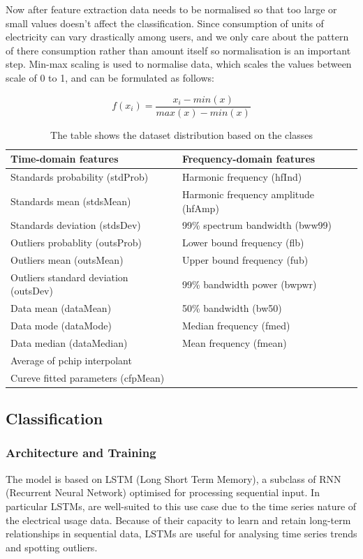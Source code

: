 \documentclass{ieeeaccess}
\begin{document}
Now after feature extraction data needs to be normalised so that too large or small values doesn't affect the classification. Since consumption of units of electricity can vary drastically among users, and we only care about the pattern of there consumption rather than amount itself so normalisation is an important step. Min-max scaling is used to normalise data, which scales the values between scale of 0 to 1, and can be formulated as follows:

\[ f(x_i)=\frac{x_i - min(x)}{max(x) - min(x)}\]

\begin{table}[ht]
\centering
\begin{tabular}{|p{4cm}|p{4cm}|}
\hline
\textbf{Time-domain features} & \textbf{Frequency-domain features} \\
\hline
Standards probability (stdProb) & Harmonic frequency (hfInd) \\
Standards mean (stdsMean) & Harmonic frequency amplitude (hfAmp) \\
Standards deviation (stdsDev) & 99\% spectrum bandwidth (bww99) \\
Outliers probablity (outsProb) & Lower bound frequency (flb) \\
Outliers mean (outsMean) & Upper bound frequency (fub) \\
Outliers standard deviation (outsDev) & 99\% bandwidth power (bwpwr) \\
Data mean (dataMean) & 50\% bandwidth (bw50) \\
Data mode (dataMode) & Median frequency (fmed) \\
Data median (dataMedian) & Mean frequency (fmean) \\
Average of pchip interpolant &  \\
Cureve fitted parameters (cfpMean) &  \\
\hline
\end{tabular}
\caption{The table shows the dataset distribution based on the classes}
\label{tab:template}
\end{table}

\subsection{Classification}
\subsubsection{Architecture and Training}
The model is based on LSTM (Long Short Term Memory), a subclass of RNN (Recurrent Neural Network) optimised for processing sequential input. In particular LSTMs, are well-suited to this use case due to the time series nature of the electrical usage data. Because of their capacity to learn and retain long-term relationships in sequential data, LSTMs are useful for analysing time series trends and spotting outliers.
\end{document}
